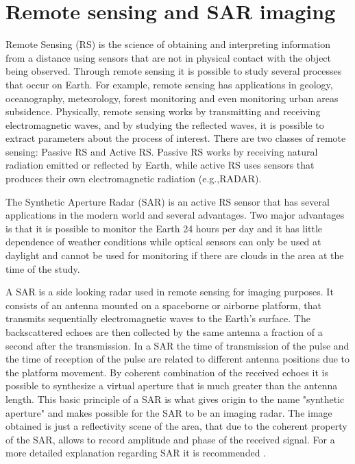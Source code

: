 
\label{chap:second}
\ifpdf
    \graphicspath{{Chapter1/Figures/PNG/}{Chapter1/Figures/PDF/}{Chapter1/Figures/}}
\else
    \graphicspath{{Chapter1/Figures/EPS/}{Chapter1/Figures/}}
\fi



\section{Remote sensing and SAR imaging}
\label{sec:sar_image_formation}
Remote Sensing (RS) is the science of obtaining and interpreting information from a distance using sensors that are not in physical contact with the object being observed. Through remote sensing it is possible to study several processes that occur on Earth. For example, remote sensing has applications in geology, oceanography, meteorology, forest monitoring and even monitoring urban areas subsidence. Physically, remote sensing works by transmitting and receiving electromagnetic waves, and by studying the reflected waves, it is possible to extract parameters about the process of interest.
There are two classes of remote sensing: Passive RS and Active RS. Passive RS works by receiving natural radiation emitted or reflected by Earth, while active RS uses sensors that produces their own electromagnetic radiation (e.g.,RADAR).

The Synthetic Aperture Radar (SAR) is an active RS sensor that has several applications in the modern world and several advantages. Two major advantages is that it is possible to monitor the Earth 24 hours per day and it has little dependence of weather conditions while optical sensors can only be used at daylight and cannot be used for monitoring if there are clouds in the area at the time of the study.

A SAR is a side looking radar used in remote sensing for imaging purposes. 
It consists of an antenna mounted on a spaceborne or airborne platform, that transmits sequentially electromagnetic waves to the Earth's surface. The backscattered echoes are then collected by the same antenna a fraction of a second after the transmission. In a SAR the time of transmission of the pulse and the time of reception of the pulse are related to different antenna positions due to the platform movement. By coherent combination of the received echoes it is possible to synthesize a virtual aperture that is much greater than the antenna length. This basic principle of a SAR is what gives origin to the name "synthetic aperture" and makes possible for the SAR to be an imaging radar. The image obtained is just a reflectivity scene of the area, that due to the coherent property of the SAR, allows to record amplitude and phase of the received signal. For a more detailed explanation regarding SAR it is recommended \cite{livro}.

